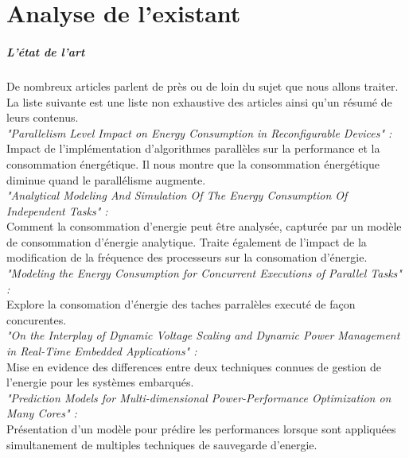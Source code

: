 \chapter{Analyse de l'existant}

\paragraph{L'état de l'art \\}
	De nombreux articles parlent de près ou de loin du sujet que nous allons traiter. \\
	La liste suivante est une liste non exhaustive des articles ainsi qu'un résumé de leurs contenus. \\

	\textit{"Parallelism Level Impact on Energy Consumption in Reconfigurable Devices" :}\cite{ref15}\\
		Impact de l’implémentation d'algorithmes parallèles sur la performance et la consommation énergétique. Il nous montre que la consommation énergétique diminue quand le parallélisme augmente.\\

	\textit{"Analytical Modeling And Simulation Of The Energy Consumption Of Independent Tasks" :}\cite{ref12}\\
		Comment la consommation d'energie peut être analysée, capturée par un modèle de consommation d'énergie analytique. Traite également de l'impact de la modification de la fréquence des processeurs sur la consomation d'énergie.\\

	\textit{"Modeling the Energy Consumption for Concurrent Executions of Parallel Tasks" :}\cite{ref14}\\
		Explore la consomation d'énergie des taches parralèles executé de façon concurentes. \\

	\textit {"On the Interplay of Dynamic Voltage Scaling and Dynamic Power Management in Real-Time Embedded Applications" :}\cite{ref13}\\
		Mise en evidence des differences entre deux techniques connues de gestion de l'energie pour les systèmes embarqués.\\

	\textit {"Prediction Models for Multi-dimensional Power-Performance Optimization on Many Cores" :}\cite{ref16}\\
		Présentation d'un modèle pour prédire les performances lorsque sont appliquées simultanement de multiples techniques de sauvegarde d'energie. \\


